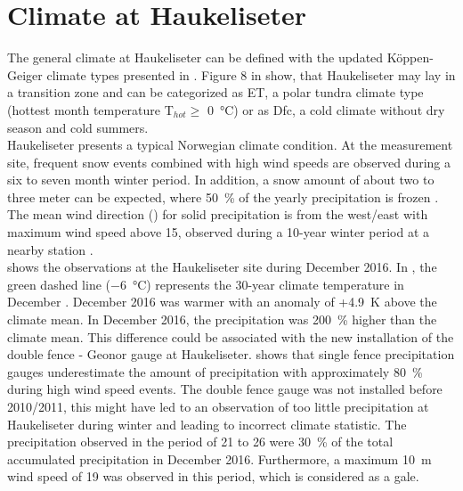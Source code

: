 \section{Climate at Haukeliseter}\label{sec:dim:dec_obs}
The general climate at Haukeliseter can be defined with the updated K\"oppen-Geiger climate types presented in \citet{peel_updated_2007}. Figure 8 in \citet{peel_updated_2007} show, that Haukeliseter may lay in a transition zone and can be categorized as ET, a polar tundra climate type (hottest month temperature T$_{hot}\ge$ \SI{0}{\celsius}) or as Dfc, a cold climate without dry season and cold summers. 
\\
Haukeliseter presents a typical Norwegian climate condition. At the measurement site, frequent snow events combined with high wind speeds are observed during a six to seven month winter period. In addition, a snow amount of about two to three meter can be expected, where \SI{50}{\percent} of the yearly precipitation is frozen \citep{wolff_derivation_2015}. 
\\
The mean wind direction () for solid precipitation is from the west/east with maximum wind speed above \SI{15}{\mPs}, observed during a 10-year winter period at a nearby station \citep{wolff_derivation_2015}. 
\\
 shows the observations at the Haukeliseter site during December 2016.
In , the green dashed line (\SI{-6}{\celsius}) represents the 30-year climate temperature in December \citep[\numrange{1961}{1990},][]{eklima_norwegian_2016}. 
December 2016 was warmer with an anomaly of +\SI{4.9}{\kelvin} above the climate mean. 
In December 2016, the precipitation was \SI{200}{\percent} higher than the climate mean. This difference could be associated with the new installation of the double fence - Geonor gauge at Haukeliseter. \citet[][Figure 5]{wolff_derivation_2015} shows that single fence precipitation gauges underestimate the amount of precipitation with approximately \SI{80}{\percent} during high wind speed events. The double fence gauge was not installed before 2010/2011, this might have led to an observation of too little precipitation at Haukeliseter during winter and leading to incorrect climate statistic.
The precipitation observed in the period of \num{21} to \SI{26}{\dec} were \SI{30}{\percent} of the total accumulated precipitation in December 2016. Furthermore, a maximum \SI{10}{\metre} wind speed of \SI{19}{\mPs} was observed in this period, which is considered as a gale. %

